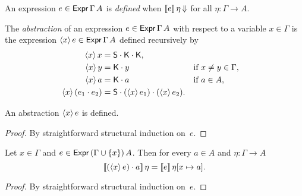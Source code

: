 \begin{definition}
  \label{def:expression-defined}
  \leanok
  An expression $e \in \mathsf{Expr}\,\Gamma\,A$ is \emph{defined} when $[\![ e ]\!] \, \eta\,{\Downarrow}$
  for all $\eta : \Gamma \to A$.
\end{definition}


\begin{definition}
  \label{def:abstraction}
  \leanok
  The \emph{abstraction} of an expression $e \in \mathsf{Expr}\,\Gamma\,A$ 
  with respect to a variable $x \in \Gamma$
  is the expression $\langle x \rangle\, e \in \mathsf{Expr}\,\Gamma\,A$ defined recursively by
  \begin{align*}
    \langle x \rangle\, x &= \mathsf{S} \cdot \mathsf{K} \cdot \mathsf{K}, \\
    \langle x \rangle\, y &= \mathsf{K} \cdot y &&\text{if $x \neq y \in \Gamma$}, \\
    \langle x \rangle\, a &= \mathsf{K} \cdot a &&\text{if $a \in A$}, \\
    \langle x \rangle\, (e_1 \cdot e_2) &= \mathsf{S} \cdot (\langle x \rangle\, e_1) \cdot (\langle x \rangle\, e_2).
  \end{align*}
\end{definition}


\begin{proposition}
  \label{prop:abstraction-defined}
  \leanok
  An abstraction $\langle x \rangle\, e$ is defined.
\end{proposition}

\begin{proof}
  \leanok
  By straightforward structural induction on~$e$.
\end{proof}

\begin{proposition}
  \label{prop:abstraction-equal}
  \leanok
  Let $x \in \Gamma$ and $e \in \mathsf{Expr}\,(\Gamma \cup \{x\})\,A$.
  Then for every $a \in A$ and $\eta : \Gamma \to A$
  \begin{equation*}
    [\![ (\langle x \rangle\, e) \cdot a ]\!] \, \eta =
    [\![ e ]\!] \, \eta[x \mapsto a].
  \end{equation*}
\end{proposition}

\begin{proof}
  \leanok
  By straightforward structural induction on~$e$.
\end{proof}

